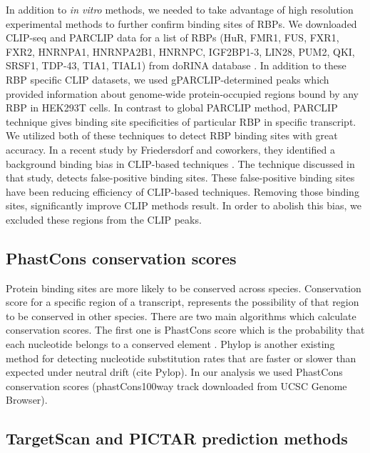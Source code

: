 In addition to \textit{in vitro} methods, we needed to take advantage of high resolution experimental methods to further confirm binding sites of RBPs. We downloaded CLIP-seq and PARCLIP data for a list of RBPs (HuR, FMR1, FUS, FXR1, FXR2, HNRNPA1, HNRNPA2B1, HNRNPC, IGF2BP1-3, LIN28, PUM2, QKI, SRSF1, TDP-43, TIA1, TIAL1) from doRINA database \cite{dorina_11}. In addition to these RBP specific CLIP datasets, we used gPARCLIP-determined peaks which provided information about genome-wide protein-occupied regions bound by any RBP in HEK293T cells. In contrast to global PARCLIP method, PARCLIP technique gives binding site specificities of particular RBP in specific transcript. We utilized both of these techniques to detect RBP binding sites with great accuracy. In a recent study by Friedersdorf and coworkers, they identified a background binding bias in CLIP-based techniques \cite{friedersdorf_14}. The technique discussed in that study, detects false-positive binding sites. These false-positive binding sites have been reducing efficiency of CLIP-based techniques. Removing those binding sites, significantly improve CLIP methods result. In order to abolish this bias, we excluded these regions from the CLIP peaks.


\subsection{PhastCons conservation scores}

Protein binding sites are more likely to be conserved across species. Conservation score for a specific region of a transcript, represents the possibility of that region to be conserved in other species. There are two main algorithms which calculate conservation scores. The first one is PhastCons score which is the probability that each nucleotide belongs to a conserved element \cite{siepel_05}. Phylop is another existing method for detecting nucleotide substitution rates that are faster or slower than expected under neutral drift (cite Pylop). In our analysis we used PhastCons conservation scores (phastCons100way track downloaded from UCSC Genome Browser).

\subsection{TargetScan and PICTAR prediction methods}

